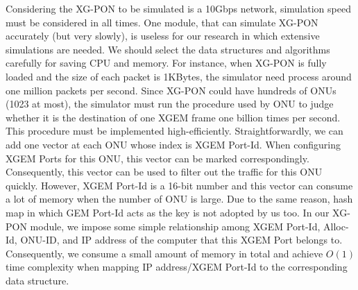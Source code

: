 \begin{itemize}
Considering the XG-PON to be simulated is a 10Gbps network,
simulation speed must be considered in all times. One module, that
can simulate XG-PON accurately (but very slowly), is useless for
our research in which extensive simulations are needed. We should
select the data structures and algorithms carefully for saving CPU
and memory. For instance, when XG-PON is fully loaded and the size
of each packet is 1KBytes, the simulator need process around one
million packets per second. Since XG-PON could have hundreds of
ONUs (1023 at most), the simulator must run the procedure used by
ONU to judge whether it is the destination of one XGEM frame one
billion times per second. This procedure must be implemented
high-efficiently. Straightforwardly, we can add one vector at each
ONU whose index is XGEM Port-Id. When configuring XGEM Ports for
this ONU, this vector can be marked correspondingly. Consequently,
this vector can be used to filter out the traffic for this ONU
quickly. However, XGEM Port-Id is a 16-bit number and this vector
can consume a lot of memory when the number of ONU is large. Due
to the same reason, hash map in which GEM Port-Id acts as the key
is not adopted by us too. In our XG-PON module, we impose some
simple relationship among XGEM Port-Id, Alloc-Id, ONU-ID, and IP
address of the computer that this XGEM Port belongs to.
Consequently, we consume a small amount of memory in total and
achieve $O(1)$ time complexity when mapping IP address/XGEM
Port-Id to the corresponding data structure.


\end{itemize}
